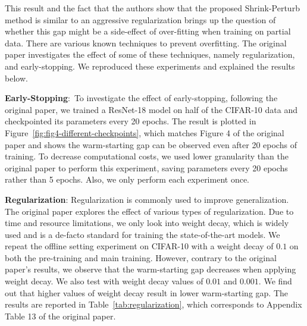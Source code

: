 This result and the fact that the authors show that the proposed Shrink-Perturb method is similar to an aggressive regularization brings up the question of whether this gap might be a side-effect of over-fitting when training on partial data.  There are various known techniques to prevent overfitting. The original paper investigates the effect of some of these techniques, namely regularization, and early-stopping. We reproduced these experiments and explained the results below.

\textbf{Early-Stopping}:~To investigate the effect of early-stopping, following the original paper, we trained a ResNet-18 model on half of the CIFAR-10 data and checkpointed its parameters every 20 epochs. The result is plotted in Figure~\ref{fig:fig4-different-checkpoints}, which matches Figure 4 of the original paper and shows the warm-starting gap can be observed even after 20 epochs of training. To decrease computational costs, we used lower granularity than the original paper to perform this experiment, saving parameters every 20 epochs rather than 5 epochs. Also, we only perform each experiment once. 


\textbf{Regularization}: Regularization is commonly used to improve generalization. The original paper explores the effect of various types of regularization. Due to time and resource limitations, we only look into weight decay, which is widely used and is a de-facto standard for training the state-of-the-art models. We repeat the offline setting experiment on CIFAR-10 with a weight decay of $0.1$ on both the pre-training and main training. However, contrary to the original paper's results, we observe that the warm-starting gap decreases when applying weight decay. We also test with weight decay values of $0.01$ and $0.001$. We find out that higher values of weight decay result in lower warm-starting gap. The results are reported in Table~\ref{tab:regularization}, which corresponds to Appendix Table 13 of the original paper.


